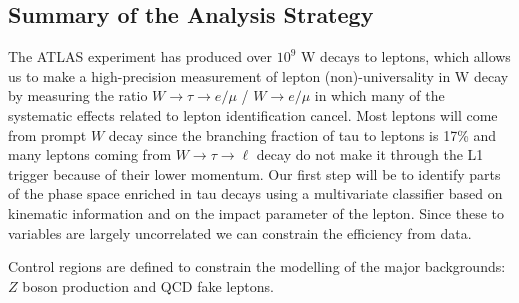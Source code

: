 \subsection{Summary of the Analysis Strategy}
The ATLAS experiment has produced over $10^9$ W decays to leptons, which allows us to make a high-precision measurement of lepton (non)-universality in W decay by measuring the ratio $W\rightarrow \tau \rightarrow e/\mu$ / $W \rightarrow e/\mu$ in which many of the systematic effects related to lepton identification cancel. 
Most leptons will come from prompt $W$ decay since the branching fraction of tau to leptons is 17\% and many leptons coming from $W\to\tau\to \ell$ decay do not make it through the L1 trigger because of their lower momentum. 
Our first step will be to identify parts of the phase space enriched in tau decays using a multivariate classifier based on kinematic information and on the impact parameter of the lepton.
Since these to variables are largely uncorrelated we can constrain the efficiency from data.

Control regions are defined to constrain the modelling of the major backgrounds: $Z$ boson production and QCD fake leptons.

